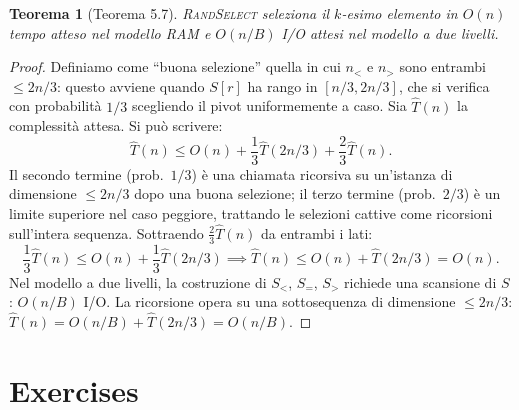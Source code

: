 \documentclass[12pt, a4paper, oneside]{book}
\theoremstyle{plain}
\newtheorem{teorema}{Teorema}[chapter]
\theoremstyle{definition}
\theoremstyle{remark}
\begin{document}
\begin{teorema}[Teorema 5.7]
\textsc{RandSelect} seleziona il $k$-esimo elemento in $O(n)$ tempo atteso nel modello RAM e $O(n/B)$ I/O attesi nel modello a due livelli.
\end{teorema}

\begin{proof}
Definiamo come ``buona selezione'' quella in cui $n_{<}$ e $n_{>}$ sono entrambi $\le 2n/3$: questo avviene quando $S[r]$ ha rango in $[n/3, 2n/3]$, che si verifica con probabilità $1/3$ scegliendo il pivot uniformemente a caso. Sia $\hat{T}(n)$ la complessità attesa. Si può scrivere:
\[
\hat{T}(n) \le O(n) + \frac{1}{3}\hat{T}(2n/3) + \frac{2}{3}\hat{T}(n).
\]
Il secondo termine (prob.\ $1/3$) è una chiamata ricorsiva su un'istanza di dimensione $\le 2n/3$ dopo una buona selezione; il terzo termine (prob.\ $2/3$) è un limite superiore nel caso peggiore, trattando le selezioni cattive come ricorsioni sull'intera sequenza. Sottraendo $\frac{2}{3}\hat{T}(n)$ da entrambi i lati:
\[
\frac{1}{3}\hat{T}(n) \le O(n) + \frac{1}{3}\hat{T}(2n/3) \implies \hat{T}(n) \le O(n) + \hat{T}(2n/3) = O(n).
\]
Nel modello a due livelli, la costruzione di $S_{<}$, $S_{=}$, $S_{>}$ richiede una scansione di $S$: $O(n/B)$ I/O. La ricorsione opera su una sottosequenza di dimensione $\le 2n/3$: $\hat{T}(n) = O(n/B) + \hat{T}(2n/3) = O(n/B)$.
\end{proof}

\section{Exercises}
\end{document}

